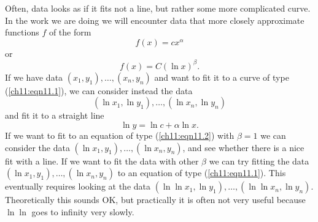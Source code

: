 \documentclass{stml-l}
\theoremstyle{definition}
\numberwithin{equation}{chapter}
\numberwithin{figure}{chapter}
\numberwithin{figure}{section}
\begin{document}
Often, data looks as if it fits not a line, but rather some more
complicated curve. In the work we are doing we will encounter data
that more closely approximate functions $f$ of the form
\begin{equation}
\label{ch11:eqn11.1}f(x)=cx^{\alpha}
\end{equation}
or
\begin{equation}
\label{ch11:eqn11.2}f(x)=C(\ln x)^{\beta}.
\end{equation}
If we have data $(x_{1},y_{1}),\ldots,(x_{n},y_{n})$ and want to fit
it to a curve of type (\ref{ch11:eqn11.1}), we can consider instead
the data
\begin{equation*}
(\ln x_{1},\ln y_{1}),\ldots,(\ln x_{n},\ln y_{n})
\end{equation*}
and fit it to a straight line
\begin{equation*}
\ln y=\ln c+\alpha\ln x.
\end{equation*}
If we want to fit to an equation of type (\ref{ch11:eqn11.2}) with
$\beta=1$ we can consider the data $(\ln x_{1},y_{1}),\ldots,(\ln
x_{n},y_{n})$, and see whether there is a nice fit with a line. If
we want to fit the data with other $\beta$ we can try fitting the
data $(\ln x_{1},y_{1}),\ldots,(\ln x_{n},y_{n})$ to an equation of
type (\ref{ch11:eqn11.1}). This eventually requires looking at the
data $(\ln\ln x_{1},\ln y_{1}),\ldots,(\ln\ln x_{n},\ln y_{n})$.
Theoretically this sounds OK, but practically it is often not very
useful because $\ln \ln$ goes to infinity very slowly.
\end{document}
